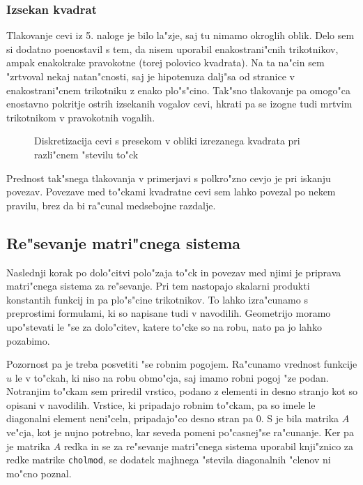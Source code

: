 \documentclass[a4paper,10pt]{article}
\begin{document}
\subsubsection{Izsekan kvadrat}

Tlakovanje cevi iz 5. naloge je bilo la"zje, saj tu nimamo okroglih oblik. Delo sem si dodatno poenostavil s tem, da nisem uporabil enakostrani"cnih trikotnikov, ampak enakokrake pravokotne (torej polovico kvadrata). Na ta na"cin sem "zrtvoval nekaj natan"cnosti, saj je hipotenuza dalj"sa od stranice v enakostrani"cnem trikotniku z enako plo"s"cino. Tak"sno tlakovanje pa omogo"ca enostavno pokritje ostrih izsekanih vogalov cevi, hkrati pa se izogne tudi mrtvim trikotnikom v pravokotnih vogalih. 

\begin{figure}[H]
\caption{Diskretizacija cevi s presekom v obliki izrezanega kvadrata pri razli"cnem "stevilu to"ck}
\label{fig:povezave-batman}
\end{figure}

Prednost tak"snega tlakovanja v primerjavi s polkro"zno cevjo je pri iskanju povezav. Povezave med to"ckami kvadratne cevi sem lahko povezal po nekem pravilu, brez da bi ra"cunal medsebojne razdalje. 

\subsection{Re"sevanje matri"cnega sistema}

Naslednji korak po dolo"citvi polo"zaja to"ck in povezav med njimi je priprava matri"cnega sistema za re"sevanje. Pri tem nastopajo skalarni produkti konstantih funkcij in pa plo"s"cine trikotnikov. To lahko izra"cunamo s preprostimi formulami, ki so napisane tudi v navodilih. Geometrijo moramo upo"stevati le "se za dolo"citev, katere to"cke so na robu, nato pa jo lahko pozabimo. 

Pozornost pa je treba posvetiti "se robnim pogojem. Ra"cunamo vrednost funkcije $u$ le v to"ckah, ki niso na robu obmo"cja, saj imamo robni pogoj "ze podan. Notranjim to"ckam sem priredil vrstico, podano z elementi in desno stranjo kot so opisani v navodilih. Vrstice, ki pripadajo robnim to"ckam, pa so imele le diagonalni element neni"celn, pripadajo"co desno stran pa 0. S je bila matrika $A$ ve"cja, kot je nujno potrebno, kar seveda pomeni po"casnej"se ra"cunanje. Ker pa je matrika $A$ redka in se za re"sevanje matri"cnega sistema uporabil knji"znico za redke matrike \texttt{cholmod}, se dodatek majhnega "stevila diagonalnih "clenov ni mo"cno poznal. 
\end{document}
